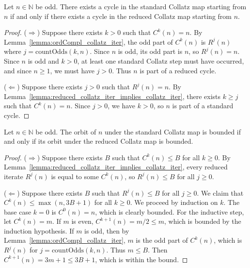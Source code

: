 \begin{lemma}\label{lemma:collatz_cycle_iff_reduced_collatz_cycle}\leanok
Let $n \in \mathbb{N}$ be odd. There exists a cycle in the standard Collatz map starting from $n$ if and only if there exists a cycle in the reduced Collatz map starting from $n$.
\end{lemma}
\begin{proof}\leanok
($\Rightarrow$) Suppose there exists $k > 0$ such that $C^k(n) = n$. By Lemma~\ref{lemma:ordCompl_collatz_iter}, the odd part of $C^k(n)$ is $R^j(n)$ where $j = \text{countOdds}(k, n)$. Since $n$ is odd, its odd part is $n$, so $R^j(n) = n$. Since $n$ is odd and $k > 0$, at least one standard Collatz step must have occurred, and since $n \ge 1$, we must have $j > 0$. Thus $n$ is part of a reduced cycle.

($\Leftarrow$) Suppose there exists $j > 0$ such that $R^j(n) = n$. By Lemma~\ref{lemma:reduced_collatz_iter_implies_collatz_iter}, there exists $k \ge j$ such that $C^k(n) = n$. Since $j > 0$, we have $k > 0$, so $n$ is part of a standard cycle.
\end{proof}

\begin{lemma}\label{lemma:collatz_bounded_iff_reduced_collatz_bounded}\leanok
Let $n \in \mathbb{N}$ be odd. The orbit of $n$ under the standard Collatz map is bounded if and only if its orbit under the reduced Collatz map is bounded.
\end{lemma}
\begin{proof}\leanok
($\Rightarrow$) Suppose there exists $B$ such that $C^k(n) \le B$ for all $k \ge 0$. By Lemma~\ref{lemma:reduced_collatz_iter_implies_collatz_iter}, every reduced iterate $R^j(n)$ is equal to some $C^k(n)$, so $R^j(n) \le B$ for all $j \ge 0$.

($\Leftarrow$) Suppose there exists $B$ such that $R^j(n) \le B$ for all $j \ge 0$. We claim that $C^k(n) \le \max(n, 3B+1)$ for all $k \ge 0$. We proceed by induction on $k$. The base case $k=0$ is $C^0(n) = n$, which is clearly bounded.
For the inductive step, let $C^k(n) = m$.
If $m$ is even, $C^{k+1}(n) = m/2 \le m$, which is bounded by the induction hypothesis.
If $m$ is odd, then by Lemma~\ref{lemma:ordCompl_collatz_iter}, $m$ is the odd part of $C^k(n)$, which is $R^j(n)$ for $j = \text{countOdds}(k, n)$. Thus $m \le B$. Then $C^{k+1}(n) = 3m+1 \le 3B+1$, which is within the bound.
\end{proof}
